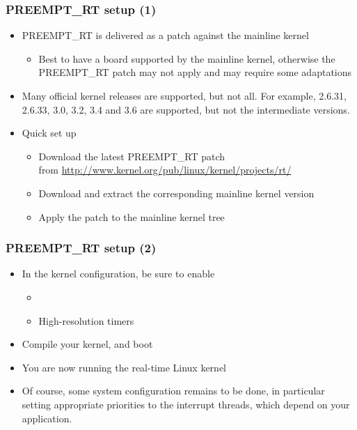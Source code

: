 \begin{frame}
  \frametitle{PREEMPT\_RT setup (1)}
  \begin{itemize}
  \item PREEMPT\_RT is delivered as a patch against the mainline
    kernel
    \begin{itemize}
    \item Best to have a board supported by the mainline kernel,
      otherwise the PREEMPT\_RT patch may not apply and may require
      some adaptations
    \end{itemize}
  \item Many official kernel releases are supported, but not all. For
    example, 2.6.31, 2.6.33, 3.0, 3.2, 3.4 and 3.6 are supported, but
    not the intermediate versions.
  \item Quick set up
    \begin{itemize}
    \item Download the latest PREEMPT\_RT patch\\
      from \footnotesize \url{http://www.kernel.org/pub/linux/kernel/projects/rt/} \normalsize
    \item Download and extract the corresponding mainline kernel
      version
    \item Apply the patch to the mainline kernel tree
    \end{itemize}
  \end{itemize}
\end{frame}

\begin{frame}
  \frametitle{PREEMPT\_RT setup (2)}
  \begin{itemize}
  \item In the kernel configuration, be sure to enable
    \begin{itemize}
    \item {}
    \item High-resolution timers
    \end{itemize}
  \item Compile your kernel, and boot
  \item You are now running the real-time Linux kernel
  \item Of course, some system configuration remains to be done, in
    particular setting appropriate priorities to the interrupt
    threads, which depend on your application.
  \end{itemize}
\end{frame}

